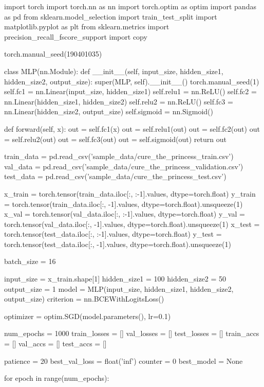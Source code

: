 \documentclass[11pt]{article}
\begin{document}
\begin{python}
import torch
import torch.nn as nn
import torch.optim as optim
import pandas as pd
from sklearn.model_selection import train_test_split
import matplotlib.pyplot as plt
from sklearn.metrics import precision_recall_fscore_support
import copy

torch.manual_seed(190401035)

class MLP(nn.Module):
    def __init__(self, input_size, hidden_size1, hidden_size2, output_size):
        super(MLP, self).__init__()
        torch.manual_seed(1)
        self.fc1 = nn.Linear(input_size, hidden_size1)
        self.relu1 = nn.ReLU()
        self.fc2 = nn.Linear(hidden_size1, hidden_size2)
        self.relu2 = nn.ReLU()
        self.fc3 = nn.Linear(hidden_size2, output_size)
        self.sigmoid = nn.Sigmoid()

    def forward(self, x):
        out = self.fc1(x)
        out = self.relu1(out)
        out = self.fc2(out)
        out = self.relu2(out)
        out = self.fc3(out)
        out = self.sigmoid(out)
        return out


train_data = pd.read_csv('sample_data/cure_the_princess_train.csv')
val_data = pd.read_csv('sample_data/cure_the_princess_validation.csv')
test_data = pd.read_csv('sample_data/cure_the_princess_test.csv')


x_train = torch.tensor(train_data.iloc[:, :-1].values, dtype=torch.float)
y_train = torch.tensor(train_data.iloc[:, -1].values, dtype=torch.float).unsqueeze(1)
x_val = torch.tensor(val_data.iloc[:, :-1].values, dtype=torch.float)
y_val = torch.tensor(val_data.iloc[:, -1].values, dtype=torch.float).unsqueeze(1)
x_test = torch.tensor(test_data.iloc[:, :-1].values, dtype=torch.float)
y_test = torch.tensor(test_data.iloc[:, -1].values, dtype=torch.float).unsqueeze(1)

batch_size = 16

input_size = x_train.shape[1]
hidden_size1 = 100
hidden_size2 = 50
output_size = 1
model = MLP(input_size, hidden_size1, hidden_size2, output_size)
criterion = nn.BCEWithLogitsLoss()

optimizer = optim.SGD(model.parameters(), lr=0.1)


num_epochs = 1000
train_losses = []
val_losses = []
test_losses = []
train_accs = []
val_accs = []
test_accs = []

patience = 20
best_val_loss = float('inf')
counter = 0
best_model = None

for epoch in range(num_epochs):
    

\end{python}
\end{document}
